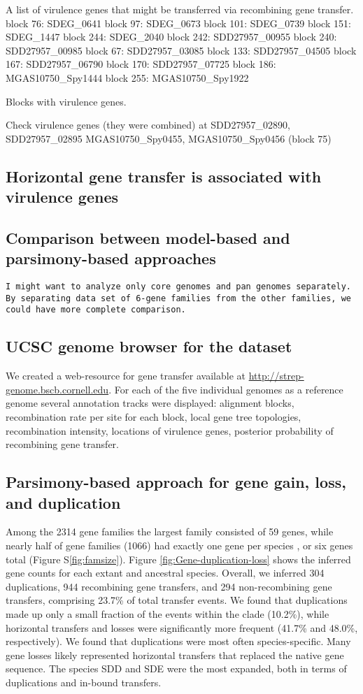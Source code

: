 \documentclass[english]{article}
\begin{document}
A list of virulence genes that might be transferred via recombining gene
transfer.
block 76: SDEG\_0641
block 97: SDEG\_0673
block 101: SDEG\_0739
block 151: SDEG\_1447
block 244: SDEG\_2040
block 242: SDD27957\_00955
block 240: SDD27957\_00985
block 67: SDD27957\_03085
block 133: SDD27957\_04505
block 167: SDD27957\_06790
block 170: SDD27957\_07725
block 186: MGAS10750\_Spy1444
block 255: MGAS10750\_Spy1922

Blocks with virulence genes.

Check virulence genes (they were combined) at 
SDD27957\_02890, SDD27957\_02895
MGAS10750\_Spy0455, MGAS10750\_Spy0456 (block 75)

\subsection{Horizontal gene transfer is associated with virulence genes}

\subsection{Comparison between model-based and parsimony-based approaches}
\texttt{I might want to analyze only core genomes and pan genomes
separately. By separating data set of 6-gene families from the other families,
we could have more complete comparison.}


\subsection{UCSC genome browser for the dataset}
We created a web-resource for gene transfer available at
\url{http://strep-genome.bscb.cornell.edu}.  For each of the five individual
genomes as a reference genome several annotation tracks were displayed:
alignment blocks, recombination rate per site for each block, local gene tree
topologies, recombination
intensity, locations of virulence genes, posterior probability of recombining
gene transfer.  

\subsection{Parsimony-based approach for gene gain, loss, and duplication}
Among the 2314 gene families
the largest family consisted of 59 genes, while
nearly half of gene families (1066) had exactly one gene per species
, or six genes total (Figure S\ref{fig:famsize}).
Figure \ref{fig:Gene-duplication-loss} shows the
inferred gene counts for each extant and ancestral species. Overall,
we inferred 304 duplications, 944 recombining gene transfers, and 294
non-recombining gene transfers, comprising 23.7\% of total transfer
events.  We found that duplications made up only a small fraction of
the events within the clade (10.2\%), while horizontal transfers and
losses were significantly more frequent (41.7\% and 48.0\%,
respectively). We found that duplications were most often
species-specific. Many gene losses likely represented horizontal
transfers that replaced the native gene sequence.  The species SDD and
SDE were the most expanded, both in terms of duplications and in-bound
transfers.
\end{document}
